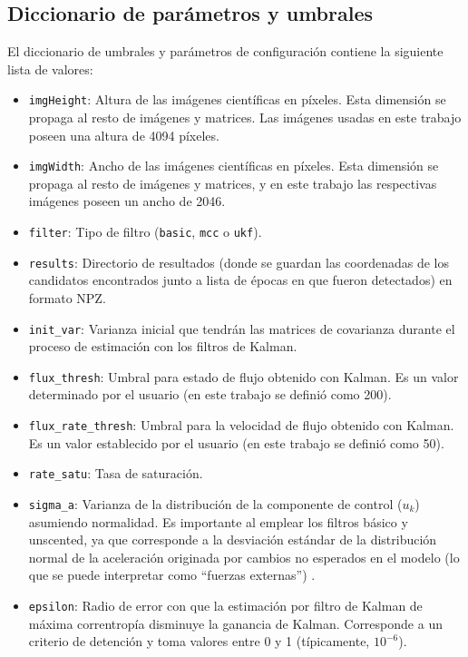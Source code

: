 \begin{appendix}
\begin{itemize}
\end{itemize}


\subsection{Diccionario de par\'ametros y umbrales}
\label{subs:a3}
El diccionario de umbrales y par\'ametros de configuraci\'on contiene la siguiente lista de valores:

\begin{itemize}
\item \texttt{imgHeight}: Altura de las im\'agenes cient\'ificas en p\'ixeles. Esta dimensi\'on se propaga al resto de im\'agenes y matrices. Las im\'agenes usadas en este trabajo poseen una altura de 4094 p\'ixeles. 
\item \texttt{imgWidth}: Ancho de las im\'agenes cient\'ificas en p\'ixeles. Esta dimensi\'on se propaga al resto de im\'agenes y matrices, y en este trabajo las respectivas im\'agenes poseen un ancho de 2046.
\item \texttt{filter}: Tipo de filtro (\texttt{basic}, \texttt{mcc} o \texttt{ukf}).
\item \texttt{results}: Directorio de resultados (donde se guardan las coordenadas de los candidatos encontrados junto a lista de \'epocas en que fueron detectados) en formato NPZ.
\item \texttt{init\_var}: Varianza inicial que tendr\'an las matrices de covarianza durante el proceso de estimaci\'on con los filtros de Kalman. 
\item \texttt{flux\_thresh}: Umbral para estado de flujo obtenido con Kalman. Es un valor determinado por el usuario (en este trabajo se defini\'o como 200). 
\item \texttt{flux\_rate\_thresh}: Umbral para la velocidad de flujo obtenido con Kalman. Es un valor establecido por el usuario (en este trabajo se defini\'o como 50).
\item \texttt{rate\_satu}: Tasa de saturaci\'on.
\item \texttt{sigma\_a}: Varianza de la distribuci\'on de la componente de control ($u_k$) asumiendo normalidad. Es importante al emplear los filtros b\'asico y unscented, ya que corresponde a la desviaci\'on est\'andar de la distribuci\'on normal de la aceleraci\'on originada por cambios no esperados en el modelo (lo que se puede interpretar como ``fuerzas externas'') \cite{ian}.
\item \texttt{epsilon}: Radio de error con que la estimaci\'on por filtro de Kalman de m\'axima correntrop\'ia disminuye la ganancia de Kalman. Corresponde a un criterio de detenci\'on y toma valores entre 0 y 1 (t\'ipicamente, $10^{-6}$)\cite{badong}.

\end{itemize}
\end{appendix}
